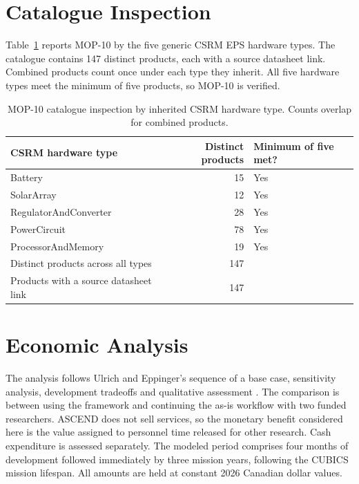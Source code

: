 \section{Catalogue Inspection}
Table~\ref{tab:cots-catalog-counts} reports MOP-10 by the five generic CSRM EPS hardware types.
The catalogue contains 147 distinct products, each with a source datasheet link.
Combined products count once under each type they inherit.
All five hardware types meet the minimum of five products, so MOP-10 is verified.

\begin{table}[htbp]
\centering
\caption{MOP-10 catalogue inspection by inherited CSRM hardware type. Counts overlap for combined products.}
\label{tab:cots-catalog-counts}
\small
\begin{tabular}{lrl}
\toprule
CSRM hardware type & Distinct products & Minimum of five met? \\
\midrule
Battery & 15 & Yes \\
SolarArray & 12 & Yes \\
RegulatorAndConverter & 28 & Yes \\
PowerCircuit & 78 & Yes \\
ProcessorAndMemory & 19 & Yes \\
\midrule
Distinct products across all types & 147 & \\
Products with a source datasheet link & 147 & \\
\bottomrule
\end{tabular}
\end{table}



\section{Economic Analysis}
\label{section:economic-analysis}

The analysis follows Ulrich and Eppinger's sequence of a base case, sensitivity analysis, development tradeoffs and qualitative assessment \citep[Chap.~17]{ulrich2013diseno}.
The comparison is between using the framework and continuing the as-is workflow with two funded researchers.
ASCEND does not sell services, so the monetary benefit considered here is the value assigned to personnel time released for other research.
Cash expenditure is assessed separately.
The modeled period comprises four months of development followed immediately by three mission years, following the CUBICS mission lifespan.
All amounts are held at constant 2026 Canadian dollar values.

